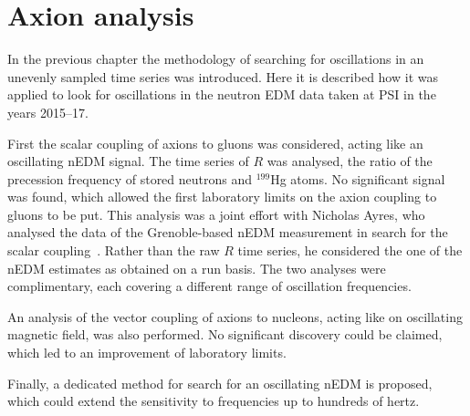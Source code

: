 \chapter{Axion analysis}
\label{ch:axion-analysis}
In the previous chapter the methodology of searching for oscillations in an unevenly sampled time series was introduced. Here it is described how it was applied to look for oscillations in the neutron EDM data taken at PSI in the years 2015--17.

First the scalar coupling of axions to gluons was considered, acting like an oscillating nEDM signal. The time series of $R$ was analysed, the ratio of the precession frequency of stored neutrons and ${}^{199}$Hg atoms. No significant signal was found, which allowed the first laboratory limits on the axion coupling to gluons to be put. This analysis was a joint effort with Nicholas Ayres, who analysed the data of the Grenoble-based nEDM measurement in search for the scalar coupling~\cite{AyresThesis}. Rather than the raw $R$ time series, he considered the one of the nEDM estimates as obtained on a run basis. The two analyses were complimentary, each covering a different range of oscillation frequencies.

An analysis of the vector coupling of axions to nucleons, acting like on oscillating magnetic field, was also performed. No significant discovery could be claimed, which led to an improvement of laboratory limits.

Finally, a dedicated method for search for an oscillating nEDM is proposed, which could extend the sensitivity to frequencies up to hundreds of hertz.





